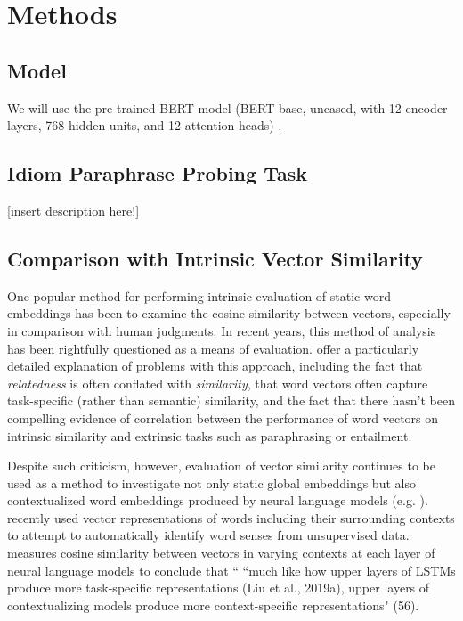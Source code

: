 \documentclass[11pt,a4paper]{article}
\begin{document}
\section{Methods}

\subsection{Model}
We will use the pre-trained BERT model (BERT-base, uncased, with 12 encoder layers, 768 hidden units, and 12 attention heads) \citep{devlin2018bert}.

\subsection{Idiom Paraphrase Probing Task}

\vspace{5mm}
[insert description here!]

\vspace{15mm}



\subsection{Comparison with Intrinsic Vector Similarity}

One popular method for performing intrinsic evaluation of static word embeddings has been to examine the cosine similarity between vectors, especially in comparison with human judgments. In recent years, this method of analysis has been rightfully questioned as a means of evaluation. \citet{faruqui-etal-2016-problems} offer a particularly detailed explanation of problems with this approach, including the fact that \textit{relatedness} is often conflated with \textit{similarity}, that word vectors often capture task-specific (rather than semantic) similarity, and the fact that there hasn't been compelling evidence of correlation between the performance of word vectors on intrinsic similarity and extrinsic tasks such as paraphrasing or entailment.

Despite such criticism, however, evaluation of vector similarity continues to be used as a method to investigate not only static global embeddings but also contextualized word embeddings produced by neural language models (e.g. \citet{van_Aken_2019}). \citet{huang_cho_bowman_2020} recently used vector representations of words including their surrounding contexts to attempt to automatically identify word senses from unsupervised data. \citep{ethayarajh2019contextual} measures cosine similarity between vectors in varying contexts at each layer of neural language models to conclude that `` ``much like how upper layers of LSTMs produce more task-specific
representations (Liu et al., 2019a), upper layers of contextualizing models produce more context-specific representations" (56).
\end{document}
